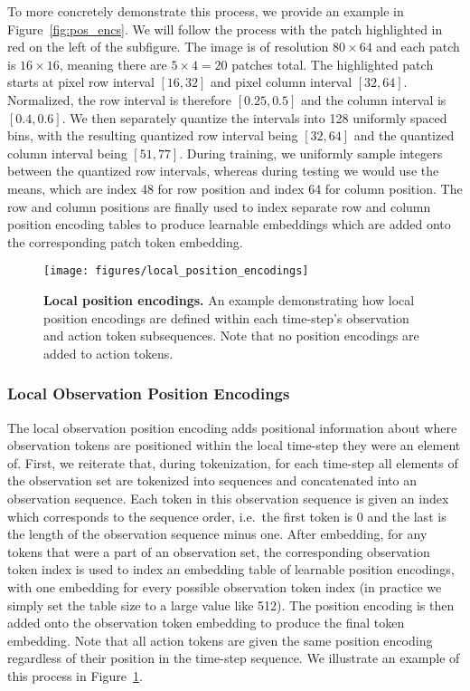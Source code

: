\documentclass[10pt]{article} \usepackage[accepted]{tmlr}
\begin{document}
To more concretely demonstrate this process, we provide an example in Figure~\ref{fig:pos_encs}. We will follow the process with the patch highlighted in red on the left of the subfigure. The image is of resolution $80\times 64$ and each patch is $16\times 16$, meaning there are $5\times 4 = 20$ patches total. The highlighted patch starts at pixel row interval $[16, 32]$ and pixel column interval $[32, 64]$. Normalized, the row interval is therefore $[0.25, 0.5]$ and the column interval is $[0.4, 0.6]$. We then separately quantize the intervals into 128 uniformly spaced bins, with the resulting quantized row interval being $[32, 64]$ and the quantized column interval being $[51, 77]$. During training, we uniformly sample integers between the quantized row intervals, whereas during testing we would use the means, which are index 48 for row position and index 64 for column position. The row and column positions are finally used to index separate row and column position encoding tables to produce learnable embeddings which are added onto the corresponding patch token embedding.

\begin{figure}[t]
    \centering
    \texttt{[image: figures/local\_position\_encodings]} 
    \caption{
    {\bf Local position encodings.}
    An example demonstrating how local position encodings are defined within each time-step's observation and action token subsequences. Note that no position encodings are added to action tokens.
    \small}
    \label{fig:local_pos_encs}
\end{figure}

\subsubsection*{Local Observation Position Encodings}

The local observation position encoding adds positional information about where observation tokens are positioned within the local time-step they were an element of. First, we reiterate that, during tokenization, for each time-step all elements of the observation set are tokenized into sequences and concatenated into an observation sequence. Each token in this observation sequence is given an index which corresponds to the sequence order, i.e.\ the first token is 0 and the last is the length of the observation sequence minus one. After embedding, for any tokens that were a part of an observation set, the corresponding observation token index is used to index an embedding table of learnable position encodings, with one embedding for every possible observation token index (in practice we simply set the table size to a large value like 512). The position encoding is then added onto the observation token embedding to produce the final token embedding. Note that all action tokens are given the same position encoding regardless of their position in the time-step sequence. We illustrate an example of this process in Figure~\ref{fig:local_pos_encs}.
\end{document}
